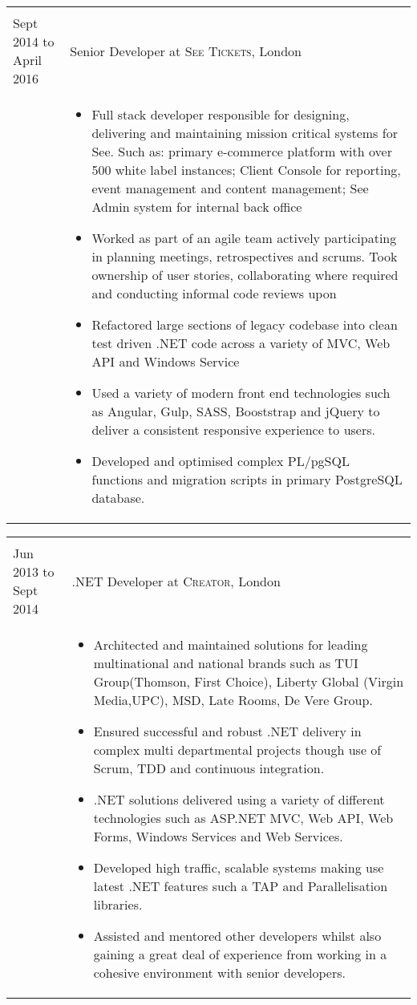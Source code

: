 \documentclass[a4paper,10pt]{article} %
\begin{document}
\begin{tabular}{ L{2cm} | L{11cm}}
	 \\
	Sept 2014 to April 2016 & Senior Developer at \textsc{See Tickets}, London \\ 
	&\MPtrue
	\begin{itemize}[leftmargin=*] 
			\item Full stack developer responsible for designing, delivering and maintaining mission critical systems for See. Such as: primary e-commerce platform with over 500 white label instances; Client Console for reporting, event management and content management; See Admin system for internal back office 
			\item Worked as part of an agile team actively participating in planning meetings, retrospectives and scrums. Took ownership of user stories, collaborating where required and conducting informal code reviews upon 
			\item Refactored large sections of legacy codebase into clean test driven .NET code across a variety of MVC, Web API and Windows Service 
			\item Used a variety of modern front end technologies such as Angular, Gulp, SASS, Booststrap and jQuery to deliver a consistent responsive experience to users. 	
			\item Developed and optimised complex PL/pgSQL functions and migration scripts in primary PostgreSQL database. 	
	\end{itemize} \\	
\end{tabular}

\begin{tabular}{ L{2cm} | L{11cm}}
	 \\
	Jun 2013 to Sept 2014 & .NET Developer at \textsc{Creator}, London \\
&\MPtrue	   
	\begin{itemize}[leftmargin=*]  
		\item Architected and maintained solutions for leading multinational and national brands such as TUI Group(Thomson, First Choice), Liberty Global (Virgin Media,UPC), MSD, Late Rooms, De Vere Group.
		\item Ensured successful and robust .NET delivery in complex multi departmental projects though use of Scrum, TDD and continuous integration. 
		\item .NET solutions delivered using a variety of different technologies such as ASP.NET MVC, Web API, Web Forms, Windows Services and Web Services. 		
		\item Developed high traffic, scalable systems making use latest .NET features such a TAP and Parallelisation libraries. 		
		\item Assisted and mentored other developers whilst also gaining a great deal of experience from working in a cohesive environment with senior developers. 
	\end{itemize} \\	
\end{tabular}
\end{document}
